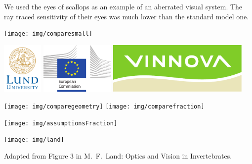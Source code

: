 \documentclass[a1paper]{betterposter}
\begin{document}
{    We used the eyes of scallops as an example of an aberrated visual system. The ray traced sensitivity of their eyes was much lower than the standard model one. 

    \vfill

    \begin{center}
        \texttt{[image: img/comparesmall]}
    \end{center}

    \vfill

    \begin{center}
        \includegraphics[height = 2.5cm]{img/lundlogo}
        \includegraphics[height = 2.5cm]{img/europeancommission}
        \includegraphics[height = 2.5cm]{img/vinnova}
    \end{center}

}{
    \large

    \begin{center}
        \texttt{[image: img/comparegeometry]}
        \texttt{[image: img/comparefraction]}
    \end{center}

    \texttt{[image: img/assumptionsFraction]}

    \begin{center}
        \texttt{[image: img/land]}
    \end{center}
    Adapted from Figure 3 in M.~F.~Land: Optics and Vision in Invertebrates.

}
\end{document}
